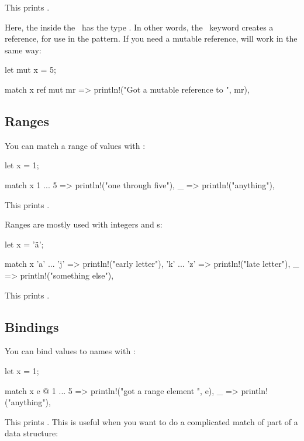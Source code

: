 This prints .

\blank

Here, the  inside the \match\ has the type . In other words, the \keyref\ keyword creates a reference, for 
use in the pattern. If you need a mutable reference, \keyref{} will work in the same way:

\begin{rustc}
let mut x = 5;

match x {
    ref mut mr => println!("Got a mutable reference to {}", mr),
}
\end{rustc}

\subsection*{Ranges}

You can match a range of values with :

\begin{rustc}
let x = 1;

match x {
    1 ... 5 => println!("one through five"),
    _ => println!("anything"),
}
\end{rustc}

This prints .

\blank

Ranges are mostly used with integers and \varchar s:

\begin{rustc}
let x = 'ä';

match x {
    'a' ... 'j' => println!("early letter"),
    'k' ... 'z' => println!("late letter"),
    _ => println!("something else"),
}
\end{rustc}

This prints .

\subsection*{Bindings}

You can bind values to names with :

\begin{rustc}
let x = 1;

match x {
    e @ 1 ... 5 => println!("got a range element {}", e),
    _ => println!("anything"),
}
\end{rustc}

This prints . This is useful when you want to do a complicated match of part of a data structure:

